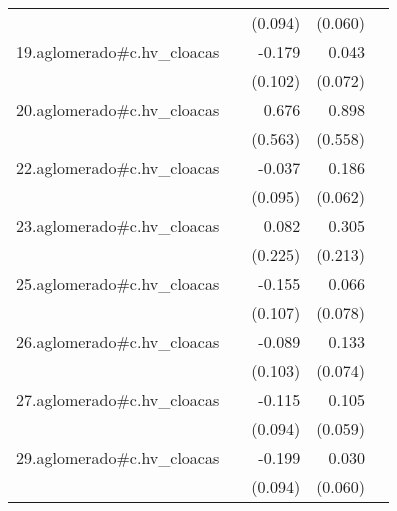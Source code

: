 {\begin{longtable}{l*{4}{D{.}{.}{-1}}}
            &                     &     (0.094)         &     (0.060)         &                     \\
\addlinespace
19.aglomerado#c.hv\_cloacas&                     &      -0.179         &       0.043         &                     \\
            &                     &     (0.102)         &     (0.072)         &                     \\
\addlinespace
20.aglomerado#c.hv\_cloacas&                     &       0.676         &       0.898         &                     \\
            &                     &     (0.563)         &     (0.558)         &                     \\
\addlinespace
22.aglomerado#c.hv\_cloacas&                     &      -0.037         &       0.186\sym{**} &                     \\
            &                     &     (0.095)         &     (0.062)         &                     \\
\addlinespace
23.aglomerado#c.hv\_cloacas&                     &       0.082         &       0.305         &                     \\
            &                     &     (0.225)         &     (0.213)         &                     \\
\addlinespace
25.aglomerado#c.hv\_cloacas&                     &      -0.155         &       0.066         &                     \\
            &                     &     (0.107)         &     (0.078)         &                     \\
\addlinespace
26.aglomerado#c.hv\_cloacas&                     &      -0.089         &       0.133         &                     \\
            &                     &     (0.103)         &     (0.074)         &                     \\
\addlinespace
27.aglomerado#c.hv\_cloacas&                     &      -0.115         &       0.105         &                     \\
            &                     &     (0.094)         &     (0.059)         &                     \\
\addlinespace
29.aglomerado#c.hv\_cloacas&                     &      -0.199\sym{*}  &       0.030         &                     \\
            &                     &     (0.094)         &     (0.060)         &                     \\

\end{longtable}}
